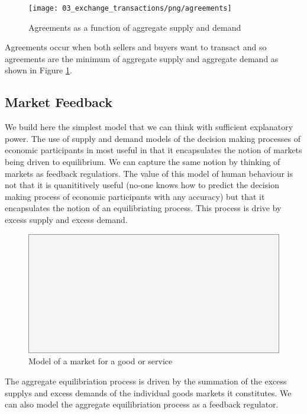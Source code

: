 \begin{figure}[H]
\centering
\texttt{[image: 03\_exchange\_transactions/png/agreements]}
\caption{Agreements as a function of aggregate supply and demand}
\label{fig:agreements}
\end{figure}

Agreements occur when both sellers and buyers want to transact and so agreements are the minimum of
aggregate supply and aggregate demand as shown in Figure \ref{fig:agreements}.

\subsection{Market Feedback}  
\label{section:market_feedback}

We build here the simplest model that we can think with sufficient explanatory power. The use of
supply and demand models of the decision making processes of economic participants in most useful in
that it encapsulates the notion of markets being driven to equilibrium. We can capture the same
notion by thinking of markets as feedback regulatiors. The value of this model of human behaviour is
not that it is quanititively useful (no-one knows how to predict the decision making process of
economic participants with any accuracy) but that it encapsulates the notion of an equilibriating
process. This process is drive by excess supply and excess demand.

\begin{figure}[H]
\centering
\includegraphics[scale=0.48]{blank}
\caption{Model of a market for a good or service}
\label{fig:micro_feedback}
\end{figure}

The aggregate equilibriation process is driven by the summation of the excess supplys and excess
demands of the individual goods markets it constitutes. We can also model the aggregate
equilibriation process as a feedback regulator.

